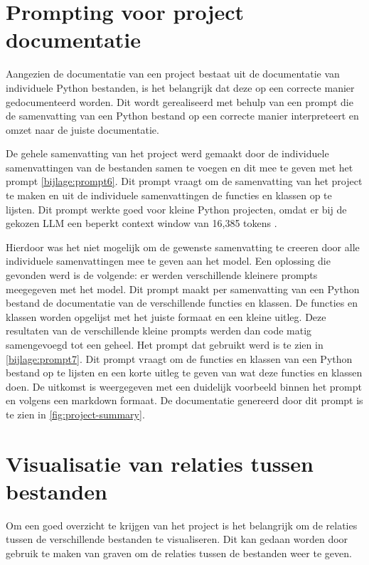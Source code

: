 \section{Prompting voor project documentatie}
\label{sec:project-documentatie-prompting}

Aangezien de documentatie van een project bestaat uit de documentatie van individuele Python bestanden, is het belangrijk dat deze op een correcte manier gedocumenteerd worden.
Dit wordt gerealiseerd met behulp van een prompt die de samenvatting van een Python bestand op een correcte manier interpreteert en omzet naar de juiste documentatie.

De gehele samenvatting van het project werd gemaakt door de individuele samenvattingen van de bestanden samen te voegen en dit mee te geven met het prompt \ref{bijlage:prompt6}.
Dit prompt vraagt om de samenvatting van het project te maken en uit de individuele samenvattingen de functies en klassen op te lijsten.
Dit prompt werkte goed voor kleine Python projecten, omdat er bij de gekozen LLM een beperkt context window van 16,385 tokens \autocite{OpenAi2024}.

Hierdoor was het niet mogelijk om de gewenste samenvatting te creeren door alle individuele samenvattingen mee te geven aan het model.
Een oplossing die gevonden werd is de volgende: er werden verschillende kleinere prompts meegegeven met het model.
Dit prompt maakt per samenvatting van een Python bestand de documentatie van de verschillende functies en klassen. 
De functies en klassen worden opgelijst met het juiste formaat en een kleine uitleg.
Deze resultaten van de verschillende kleine prompts werden dan code matig samengevoegd tot een geheel. 
Het prompt dat gebruikt werd is te zien in \ref{bijlage:prompt7}.
Dit prompt vraagt om de functies en klassen van een Python bestand op te lijsten en een korte uitleg te geven van wat deze functies en klassen doen.
De uitkomst is weergegeven met een duidelijk voorbeeld binnen het prompt en volgens een markdown formaat. 
De documentatie genereerd door dit prompt is te zien in \ref{fig:project-summary}.

\section{Visualisatie van relaties tussen bestanden}
\label{sec:project-documentatie-relaties}

Om een goed overzicht te krijgen van het project is het belangrijk om de relaties tussen de verschillende bestanden te visualiseren.
Dit kan gedaan worden door gebruik te maken van graven om de relaties tussen de bestanden weer te geven.

